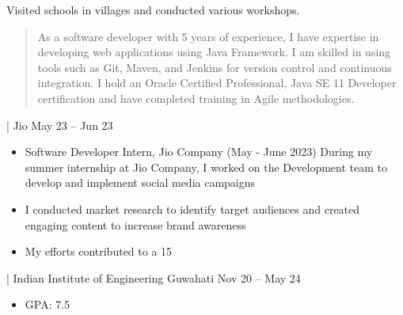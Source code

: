 \documentclass[10pt,a4paper,ragged2e,withhyper]{altacv}
\begin{document}
\begin{paracol}{2}
            \par
            Visited schools in villages and conducted various workshops.
            \smallskip
            
        \newpage

        \switchcolumn
        
            \begin{quote}
                As a software developer with 5 years of experience, I have expertise in developing web applications using Java Framework. I am skilled in using tools such as Git, Maven, and Jenkins for version control and continuous integration. I hold an Oracle Certified Professional, Java SE 11 Developer certification and have completed training in Agile methodologies.
            \end{quote}

                    {| Jio}
                    {May 23 -- Jun 23}{}
                \begin{itemize}
                        \item Software Developer Intern, Jio Company (May - June 2023) During my summer internship at Jio Company, I worked on the Development team to develop and implement social media campaigns
                        \item I conducted market research to identify target audiences and created engaging content to increase brand awareness
                        \item My efforts contributed to a 15%
                \end{itemize}
                \divider
        
                    {| Indian Institute of Engineering Guwahati}
                    {Nov 20 -- May 24}{}
                \begin{itemize}
                    \item GPA: 7.5
                \end{itemize}
                \divider
        

\end{paracol}
\end{document}
